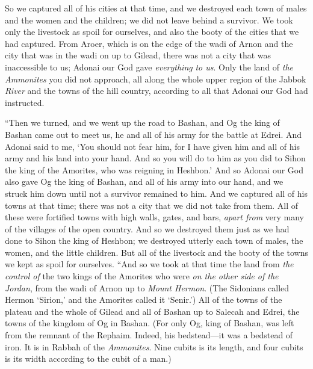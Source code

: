 \begin{biblechapter}
\verse So we captured all of his cities at that time, and we destroyed each town of males and the women and the children; we did not leave behind a survivor.
\verse We took only the livestock as spoil for ourselves, and also the booty of the cities that we had captured.
\verse From Aroer, which is on the edge of the wadi of Arnon and the city that was in the wadi on up to Gilead, there was not a city that was inaccessible to us; Adonai our God gave \textit{everything} \textit{to us}.
\verse Only the land of \textit{the Ammonites} you did not approach, all along the whole upper region of the Jabbok \textit{River} and the towns of the hill country, according to all that Adonai our God had instructed.
\end{biblechapter}

\begin{biblechapter} %
\verse “Then we turned, and we went up the road to Bashan, and Og the king of Bashan came out to meet us, he and all of his army for the battle at Edrei.
\verse And Adonai said to me, ‘You should not fear him, for I have given him and all of his army and his land into your hand. And so you will do to him as you did to Sihon the king of the Amorites, who was reigning in Heshbon.’
\verse And so Adonai our God also gave Og the king of Bashan, and all of his army into our hand, and we struck him down until not a survivor remained to him.
\verse And we captured all of his towns at that time; there was not a city that we did not take from them.
\verse All of these were fortified towns with high walls, gates, and bars, \textit{apart from} very many of the villages of the open country.
\verse And so we destroyed them just as we had done to Sihon the king of Heshbon; we destroyed utterly each town of males, the women, and the little children.
\verse But all of the livestock and the booty of the towns we kept as spoil for ourselves.
\verse “And so we took at that time the land from \textit{the control of} the two kings of the Amorites who were \textit{on the other side of the Jordan}, from the wadi of Arnon up to \textit{Mount Hermon}.
\verse (The Sidonians called Hermon ‘Sirion,’ and the Amorites called it ‘Senir.’)
\verse All of the towns of the plateau and the whole of Gilead and all of Bashan up to Salecah and Edrei, the towns of the kingdom of Og in Bashan.
\verse (For only Og, king of Bashan, was left from the remnant of the Rephaim. Indeed, his bedstead—it was a bedstead of iron. It is in Rabbah of the \textit{Ammonites}. Nine cubits is its length, and four cubits is its width according to the cubit of a man.)

\end{biblechapter}
